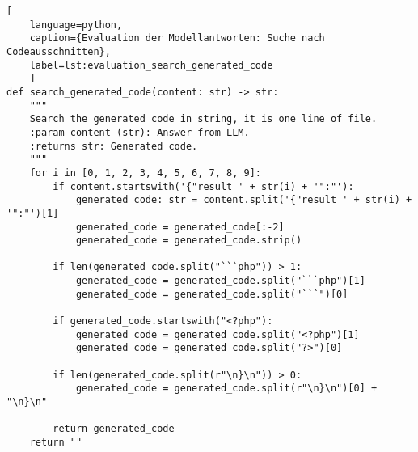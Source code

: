 \begin{lstlisting}[
	language=python,
	caption={Evaluation der Modellantworten: Suche nach Codeausschnitten},
	label=lst:evaluation_search_generated_code
	]
def search_generated_code(content: str) -> str:
    """
    Search the generated code in string, it is one line of file.
    :param content (str): Answer from LLM.
    :returns str: Generated code.
    """
    for i in [0, 1, 2, 3, 4, 5, 6, 7, 8, 9]:
        if content.startswith('{"result_' + str(i) + '":"'):
            generated_code: str = content.split('{"result_' + str(i) + '":"')[1]
            generated_code = generated_code[:-2]
            generated_code = generated_code.strip()

        if len(generated_code.split("```php")) > 1:
            generated_code = generated_code.split("```php")[1]
            generated_code = generated_code.split("```")[0]

        if generated_code.startswith("<?php"):
            generated_code = generated_code.split("<?php")[1]
            generated_code = generated_code.split("?>")[0]

        if len(generated_code.split(r"\n}\n")) > 0:
            generated_code = generated_code.split(r"\n}\n")[0] + "\n}\n"

        return generated_code
    return ""
\end{lstlisting}
